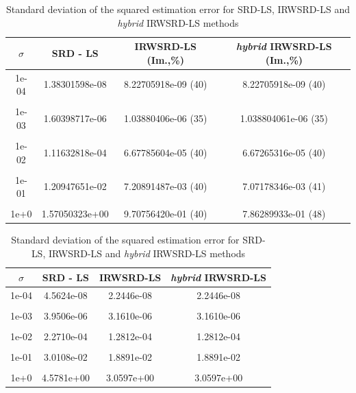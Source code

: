 \begin{table}[h]
\centering
\caption{MSE of position estimation for SRD-LS, IRWSRD-LS and \textit{hybrid} IRWSRD-LS methods}
\phantom{m}
\begin{tabular}{|c|c|c|c|} \hline
\centering
$\sigma$ & SRD - LS & IRWSRD-LS (Im.,\%) & \textit{hybrid} IRWSRD-LS (Im.,\%) \\ \hline
1e-04&  1.38301598e-08 & 8.22705918e-09 (40) &  8.22705918e-09 (40) \\ &&&\\ 
1e-03&	1.60398717e-06 & 1.03880406e-06 (35)&  1.038804061e-06 (35) \\ &&&\\
1e-02&	1.11632818e-04 & 6.67785604e-05 (40)&  6.67265316e-05 (40)  \\ &&&\\
1e-01&	1.20947651e-02 & 7.20891487e-03 (40)&  7.07178346e-03 (41) 	 \\ &&&\\
1e+0&	1.57050323e+00 & 9.70756420e-01 (40)&  7.86289933e-01 (48)  \\ %
\hline
\end{tabular}
\label{tab:3}
\centering
\caption{Standard deviation of the squared estimation error for SRD-LS, IRWSRD-LS and \textit{hybrid} IRWSRD-LS methods}
\phantom{m}
\begin{tabular}{|c|c|c|c|} \hline
$\sigma$ & SRD - LS & IRWSRD-LS & \textit{hybrid} IRWSRD-LS \\ \hline
1e-04&  4.5624e-08 &   2.2446e-08 &  2.2446e-08\\ &&&\\
1e-03&	3.9506e-06 &   3.1610e-06 &  3.1610e-06\\ &&&\\
1e-02&	2.2710e-04 &   1.2812e-04 &  1.2812e-04\\ &&&\\
1e-01&	3.0108e-02 &   1.8891e-02 &  1.8891e-02\\ &&&\\
1e+0&	4.5781e+00 &   3.0597e+00 &  3.0597e+00\\ %
\hline
\end{tabular}
\label{tab:4}
\end{table}

